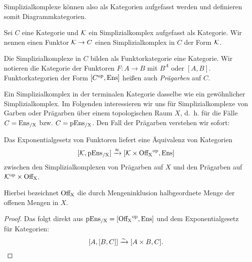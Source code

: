 Simplizialkomplexe können also als Kategorien aufgefasst werden und
definieren somit Diagrammkategorien.
\begin{defn}
  Sei $C$ eine Kategorie und $\mathcal{K}$ ein Simplizialkomplex
  aufgefasst als Kategorie. Wir nennen einen Funktor $\mathcal{K} \to
  C$ einen Simplizialkomplex in $C$ der Form $\mathcal{K}$.
\end{defn}
Die Simplizialkomplexe in $C$ bilden als Funktorkategorie eine
Kategorie. Wir notieren die Kategorie der Funktoren $F: A \to B$ mit
$B^A$ oder $[A, B]$. Funktorkategorien der Form $[C^\mathrm{op}, \operatorname{Ens}]$ heißen
auch \emph{Prägarben} auf $C$.

Ein Simplizialkomplex in der terminalen Kategorie dasselbe wie ein
gewöhnlicher Simplizialkomplex. Im Folgenden interessieren wir uns für
Simplizialkomplexe von Garben oder Prägarben über einem topologischen
Raum $X$, d.~h. für die Fälle $C = \operatorname{Ens_{/X}}$ bzw. $C = \operatorname{pEns_{/X}}$. Den Fall
der Prägarben verstehen wir sofort:
\begin{lemma}
  Das Exponentialgesetz von Funktoren liefert eine Äquivalenz von
  Kategorien
  \[
    [\mathcal{K}, \operatorname{pEns_{/X}}] \xrightarrow{\approx} {[\mathcal{K} \times \operatorname{Off_X}^\mathrm{op}, \operatorname{Ens}]}
  \]    
  zwischen den Simplizialkomplexen von Prägarben auf $X$ und den
  Prägarben auf $\mathcal{K}^\mathrm{op} \times \operatorname{Off_X}$.
\end{lemma}
Hierbei bezeichnet $\operatorname{Off_X}$ die durch Mengeninklusion halbgeordnete
Menge der offenen Mengen in $X$.
\begin{proof}
  Das folgt direkt aus $\operatorname{pEns_{/X}} = [\operatorname{Off_X}^\mathrm{op}, \operatorname{Ens}]$ und dem
  Exponentialgesetz für Kategorien:
  \[ [A, [B, C]] \xrightarrow[]{\sim} {[A \times B, C]}. \]
\end{proof}

